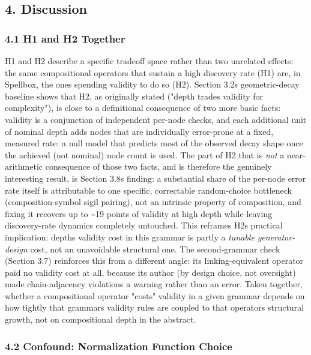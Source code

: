 \documentclass[
  10pt,
  twocolumn]{article}
\begin{document}
\subsection{4. Discussion}\label{4-discussion}

\subsubsection{4.1 H1 and H2 Together}\label{41-h1-and-h2-together}

H1 and H2 describe a specific tradeoff space rather than two unrelated
effects: the same compositional operators that sustain a high discovery
rate (H1) are, in Spellbox, the ones spending validity to do so (H2).
Section 3.2\textquotesingle s geometric-decay baseline shows that H2, as
originally stated ("depth trades validity for complexity"), is close to
a definitional consequence of two more basic facts: validity is a
conjunction of independent per-node checks, and each additional unit of
nominal depth adds nodes that are individually error-prone at a fixed,
measured rate: a null model that predicts most of the observed decay
shape once the achieved (not nominal) node count is used. The part of H2
that is \emph{not} a near-arithmetic consequence of those two facts, and
is therefore the genuinely interesting result, is Section
3.8\textquotesingle s finding: a substantial share of the per-node error
rate itself is attributable to one specific, correctable random-choice
bottleneck (composition-symbol sigil pairing), not an intrinsic property
of composition, and fixing it recovers up to \textasciitilde19 points of
validity at high depth while leaving discovery-rate dynamics completely
untouched. This reframes H2\textquotesingle s practical implication:
depth\textquotesingle s validity cost in this grammar is partly a
\emph{tunable generator-design} cost, not an unavoidable structural one.
The second-grammar check (Section 3.7) reinforces this from a different
angle: its linking-equivalent operator paid no validity cost at all,
because its author (by design choice, not oversight) made
chain-adjacency violations a warning rather than an error. Taken
together, whether a compositional operator "costs" validity in a given
grammar depends on how tightly that grammar\textquotesingle s validity
rules are coupled to that operator\textquotesingle s structural growth,
not on compositional depth in the abstract.

\subsubsection{4.2 Confound: Normalization Function
Choice}\label{42-confound-normalization-function-choice}
\end{document}
